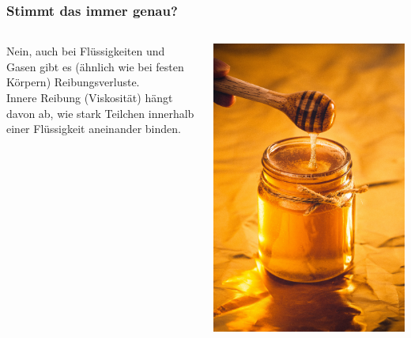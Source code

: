 \documentclass{beamer}
\begin{document}
\begin{frame}
\frametitle{Stimmt das immer genau?}

\pause
\begin{columns}[c]
\begin{column}{5cm}

Nein, auch bei Flüssigkeiten und Gasen gibt es (ähnlich wie bei festen Körpern) Reibungsverluste. \\

Innere Reibung (Viskosität) hängt davon ab, wie stark Teilchen innerhalb einer Flüssigkeit aneinander binden. 

\end{column}

\begin{column}{5cm}
\begin{center}
\includegraphics[width=\textwidth]{honey.jpg}
\end{center}
\end{column}

\end{columns}

\end{frame}
\end{document}
